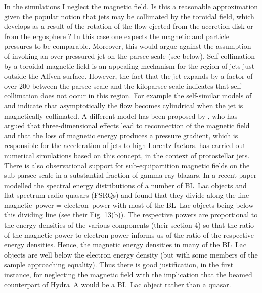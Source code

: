 In the simulations I neglect the magnetic field. Is this a reasonable approximation given the popular notion that jets may be collimated by the toroidal field, which develops as a result of the rotation of the flow ejected from the accretion disk \citep{blandford82a} or from the ergosphere \citep{blandford77a}? In this case one expects the magnetic and particle pressures to be comparable. Moreover, this would argue against the assumption of invoking an over-pressured jet on the parsec-scale (see below). Self-collimation by a toroidal magnetic field is an appealing mechanism for the region of jets just outside the Alfven surface. However, the fact that the jet expands by a factor of over 200 between the parsec scale and the kiloparsec scale indicates that self-collimation does not occur in this region. For example the self-similar models of \citet{li92a} and \citet{vlahakis03a} indicate that asymptotically the flow becomes cylindrical when the jet is magnetically collimated. A different model has been proposed by \citet{spruit11a}, who has argued that three-dimensional effects lead to reconnection of the magnetic field and that the loss of magnetic energy produces a pressure gradient, which is responsible for the acceleration of jets to high Lorentz factors. \citet{moll09a,moll10a} has carried out numerical simulations based on this concept, in the context of protostellar jets. There is also observational support for 
sub-equipartition magnetic fields on the sub-parsec scale in a substantial fraction of gamma ray blazars. In a recent paper \citet{zhang14a} modelled the spectral energy distributions of a number of BL~Lac objects and flat spectrum radio quasars (FSRQs) and found that they divide along the line magnetic~power = electron~power with most of the BL~Lac objects being below this dividing line (see their Fig. 13(b)). The respective powers are proportional to the energy densities of the various components (their section 4) so that the ratio of the magnetic power to electron power informs us of the ratio of the respective energy densities. Hence, the magnetic energy densities in many of the BL~Lac objects are well below the electron energy density (but with some members of the sample approaching equality). Thus there is good justification, in the first instance, for neglecting the magnetic field with the implication that the beamed counterpart of Hydra~A would be a BL~Lac object rather than a quasar. 

